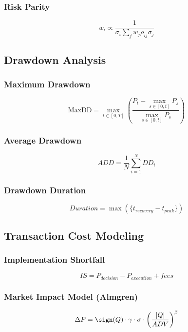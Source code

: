 \documentclass[11pt,letterpaper]{book}
\newcommand{\MaxDD}{\mathrm{MaxDD}}
\begin{document}
\subsubsection{Risk Parity}
\begin{equation}
w_i \propto \frac{1}{\sigma_i \sum_j w_j \rho_{ij} \sigma_j}
\end{equation}

\subsection{Drawdown Analysis}

\subsubsection{Maximum Drawdown}
\begin{equation}
\MaxDD = \max_{t \in [0,T]} \left( \frac{P_t - \max_{s \in [0,t]} P_s}{\max_{s \in [0,t]} P_s} \right)
\end{equation}

\subsubsection{Average Drawdown}
\begin{equation}
ADD = \frac{1}{N} \sum_{i=1}^N DD_i
\end{equation}

\subsubsection{Drawdown Duration}
\begin{equation}
Duration = \max(\{t_{recovery} - t_{peak} \})
\end{equation}

\subsection{Transaction Cost Modeling}

\subsubsection{Implementation Shortfall}
\begin{equation}
IS = P_{decision} - P_{execution} + fees
\end{equation}

\subsubsection{Market Impact Model (Almgren)}
\begin{equation}
\Delta P = \sign(Q) \cdot \gamma \cdot \sigma \cdot \left( \frac{|Q|}{ADV} \right)^\beta
\end{equation}
\end{document}
